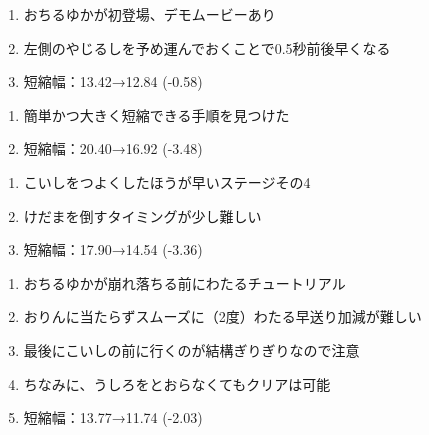 


\begin{enumerate}[label={\sarrow}]
\item おちるゆかが初登場、デモムービーあり
\item 左側のやじるしを予め運んでおくことで0.5秒前後早くなる
\item 短縮幅：13.42→12.84 (-0.58)
\end{enumerate}



\begin{enumerate}[label={\sarrow}]
\item 簡単かつ大きく短縮できる手順を見つけた
\item 短縮幅：20.40→16.92 (-3.48)
\end{enumerate}



\begin{enumerate}[label={\sarrow}]
\item こいしをつよくしたほうが早いステージその4
\item けだまを倒すタイミングが少し難しい
\item 短縮幅：17.90→14.54 (-3.36)
\end{enumerate}



\begin{enumerate}[label={\sarrow}]
\item おちるゆかが崩れ落ちる前にわたるチュートリアル
\item おりんに当たらずスムーズに（2度）わたる早送り加減が難しい
\item 最後にこいしの前に行くのが結構ぎりぎりなので注意
\item ちなみに、うしろをとおらなくてもクリアは可能
\item 短縮幅：13.77→11.74 (-2.03)
\end{enumerate}



